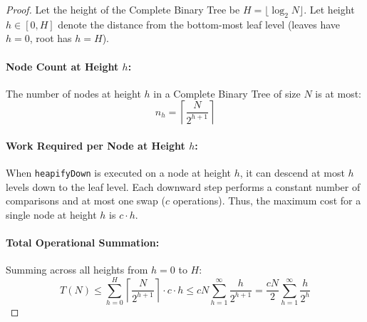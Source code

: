 \documentclass[10pt,twocolumn,letterpaper]{article}
\begin{document}
\begin{proof}
Let the height of the Complete Binary Tree be $H = \lfloor \log_2 N \rfloor$. Let height $h \in [0, H]$ denote the distance from the bottom-most leaf level (leaves have $h = 0$, root has $h = H$).

\paragraph{Node Count at Height $h$:}
The number of nodes at height $h$ in a Complete Binary Tree of size $N$ is at most:
\begin{equation}
n_h = \left\lceil \frac{N}{2^{h+1}} \right\rceil
\end{equation}

\paragraph{Work Required per Node at Height $h$:}
When \texttt{heapifyDown} is executed on a node at height $h$, it can descend at most $h$ levels down to the leaf level. Each downward step performs a constant number of comparisons and at most one swap ($c$ operations). Thus, the maximum cost for a single node at height $h$ is $c \cdot h$.

\paragraph{Total Operational Summation:}
Summing across all heights from $h = 0$ to $H$:
\begin{equation}
T(N) \le \sum_{h=0}^H \left\lceil \frac{N}{2^{h+1}} \right\rceil \cdot c \cdot h \le c N \sum_{h=1}^\infty \frac{h}{2^{h+1}} = \frac{cN}{2} \sum_{h=1}^\infty \frac{h}{2^h}
\end{equation}


\end{proof}
\end{document}
